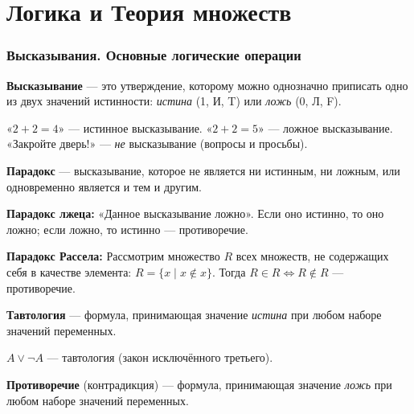 \documentclass[12pt]{article}
\begin{document}
\tableofcontents
\setcounter{tocdepth}{3}
\newpage

\part{Логика и Теория множеств}

\section{Высказывания. Основные логические операции}

\begin{definition}
\textbf{Высказывание} --- это утверждение, которому можно однозначно
приписать одно из двух значений истинности: \emph{истина} (1, И, T)
или \emph{ложь} (0, Л, F).
\end{definition}

\begin{example}
«$2 + 2 = 4$» --- истинное высказывание.
«$2 + 2 = 5$» --- ложное высказывание.
«Закройте дверь!» --- \emph{не} высказывание (вопросы и просьбы).
\end{example}

\begin{definition}
\textbf{Парадокс} --- высказывание, которое не является ни истинным,
ни ложным, или одновременно является и тем и другим.
\end{definition}

\begin{example}
\textbf{Парадокс лжеца:} «Данное высказывание ложно». Если оно истинно,
то оно ложно; если ложно, то истинно --- противоречие.

\textbf{Парадокс Рассела:} Рассмотрим множество $R$ всех множеств,
не содержащих себя в качестве элемента:
$R = \{x \mid x \notin x\}$.
Тогда $R \in R \Leftrightarrow R \notin R$ --- противоречие.
\end{example}

\begin{definition}
\textbf{Тавтология} --- формула, принимающая значение \emph{истина}
при любом наборе значений переменных.
\end{definition}

\begin{example}
$A \vee \neg A$ --- тавтология (закон исключённого третьего).
\end{example}

\begin{definition}
\textbf{Противоречие} (контрадикция) --- формула, принимающая значение
\emph{ложь} при любом наборе значений переменных.
\end{definition}
\end{document}
